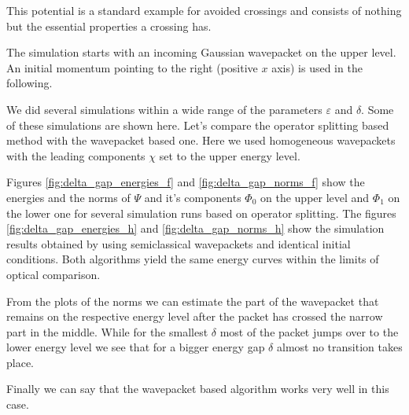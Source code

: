 This potential is a standard example for avoided crossings and consists of nothing
but the essential properties a crossing has.

The simulation starts with an incoming Gaussian wavepacket on the upper level.
An initial momentum pointing to the right (positive $x$ axis) is used in the following.

We did several simulations within a wide range of the parameters $\varepsilon$
and $\delta$. Some of these simulations are shown here. Let's compare the operator
splitting based method with the wavepacket based one. Here we used homogeneous
wavepackets with the leading components $\chi$ set to the upper energy level.

Figures \ref{fig:delta_gap_energies_f} and \ref{fig:delta_gap_norms_f} show the
energies and the norms of $\Psi$ and it's components $\Phi_0$ on the upper level
and $\Phi_1$ on the lower one for several simulation runs based on operator
splitting. The figures \ref{fig:delta_gap_energies_h} and \ref{fig:delta_gap_norms_h}
show the simulation results obtained by using semiclassical wavepackets and identical
initial conditions. Both algorithms yield the same energy curves within the limits
of optical comparison.

From the plots of the norms we can estimate the part of the wavepacket that remains
on the respective energy level after the packet has crossed the narrow part in the
middle. While for the smallest $\delta$ most of the packet jumps over to the lower
energy level we see that for a bigger energy gap $\delta$ almost no transition
takes place.

Finally we can say that the wavepacket based algorithm works very well in this case.

